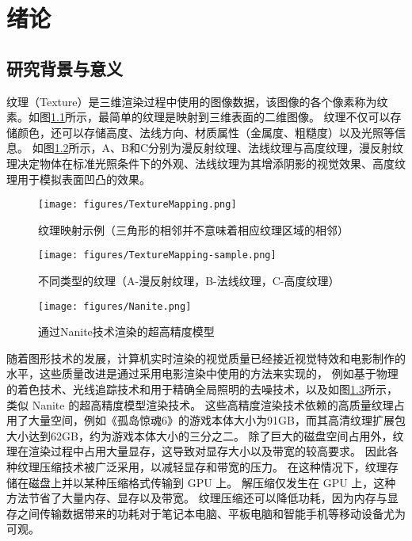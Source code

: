 
\chapter{绪论}

\section{研究背景与意义}
纹理（Texture）是三维渲染过程中使用的图像数据，该图像的各个像素称为纹素。如图\ref{fig:TextureMapping}所示，最简单的纹理是映射到三维表面的二维图像。
纹理不仅可以存储颜色，还可以存储高度、法线方向、材质属性（金属度、粗糙度）以及光照等信息。
如图\ref{fig:TextureMapping-sample}所示，A、B和C分别为漫反射纹理、法线纹理与高度纹理，漫反射纹理决定物体在标准光照条件下的外观、法线纹理为其增添阴影的视觉效果、高度纹理用于模拟表面凹凸的效果。

\begin{figure}[htbp]
    \centering
    \texttt{[image: figures/TextureMapping.png]}
    \caption{纹理映射示例（三角形的相邻并不意味着相应纹理区域的相邻）}
    \label{fig:TextureMapping}
\end{figure}

\begin{figure}[htbp]
    \centering
    \texttt{[image: figures/TextureMapping-sample.png]}
    \caption{不同类型的纹理（A-漫反射纹理，B-法线纹理，C-高度纹理）}
    \label{fig:TextureMapping-sample}
\end{figure}

\begin{figure}[htbp]
    \centering
    \texttt{[image: figures/Nanite.png]}
    \caption{通过Nanite技术渲染的超高精度模型}
    \label{fig:Nanite}
\end{figure}

随着图形技术的发展，计算机实时渲染的视觉质量已经接近视觉特效和电影制作的水平，这些质量改进是通过采用电影渲染中使用的方法来实现的，
例如基于物理的着色技术、光线追踪技术和用于精确全局照明的去噪技术，以及如图\ref{fig:Nanite}所示，类似 Nanite 的超高精度模型渲染技术。
这些高精度渲染技术依赖的高质量纹理占用了大量空间，例如《孤岛惊魂6》的游戏本体大小为91GB，而其高清纹理扩展包大小达到62GB，约为游戏本体大小的三分之二\cite{FarCry6}。
除了巨大的磁盘空间占用外，纹理在渲染过程中占用大量显存，这导致对显存大小以及带宽的较高要求。
因此各种纹理压缩技术被广泛采用，以减轻显存和带宽的压力。
在这种情况下，纹理存储在磁盘上并以某种压缩格式传输到 GPU 上。
解压缩仅发生在 GPU 上，这种方法节省了大量内存、显存以及带宽。
纹理压缩还可以降低功耗，因为内存与显存之间传输数据带来的功耗对于笔记本电脑、平板电脑和智能手机等移动设备尤为可观。

